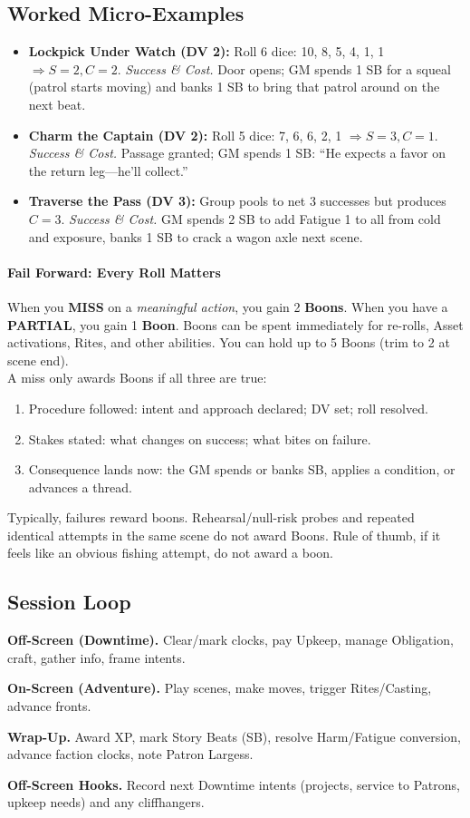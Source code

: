 \subsection{Worked Micro-Examples}
\begin{itemize}
  \item \textbf{Lockpick Under Watch (DV 2):} Roll 6 dice: 10, 8, 5, 4, 1, 1 $\Rightarrow S=2, C=2$. \emph{Success \& Cost.} Door opens; GM spends 1 SB for a squeal (patrol starts moving) and banks 1 SB to bring that patrol around on the next beat.
  \item \textbf{Charm the Captain (DV 2):} Roll 5 dice: 7, 6, 6, 2, 1 $\Rightarrow S=3, C=1$. \emph{Success \& Cost.} Passage granted; GM spends 1 SB: ``He expects a favor on the return leg—he'll collect.''
  \item \textbf{Traverse the Pass (DV 3):} Group pools to net 3 successes but produces $C=3$. \emph{Success \& Cost.} GM spends 2 SB to add Fatigue 1 to all from cold and exposure, banks 1 SB to crack a wagon axle next scene.
\end{itemize}

\paragraph{Fail Forward: Every Roll Matters}
When you \textbf{MISS} on a \emph{meaningful action}, you gain 2 \textbf{Boons}. When you have a \textbf{PARTIAL}, you gain 1 \textbf{Boon}. Boons can be spent immediately for re-rolls, Asset activations, Rites, and other abilities. You can hold up to 5 Boons (trim to 2 at scene end).\\
A miss only awards Boons if all three are true:
\begin{enumerate}
  \item Procedure followed: intent and approach declared; DV set; roll resolved.
  \item Stakes stated: what changes on success; what bites on failure.
  \item Consequence lands now: the GM spends or banks SB, applies a condition, or advances a thread.
\end{enumerate}
Typically, failures reward boons. Rehearsal/null-risk probes and repeated identical attempts in the same scene do not award Boons. Rule of thumb, if it feels like an obvious fishing attempt, do not award a boon.

\subsection{Session Loop}

\textbf{Off-Screen (Downtime).} Clear/mark clocks, pay Upkeep, manage Obligation, craft, gather info, frame intents.

\textbf{On-Screen (Adventure).} Play scenes, make moves, trigger Rites/Casting, advance fronts.

\textbf{Wrap-Up.} Award XP, mark Story Beats (SB), resolve Harm/Fatigue conversion, advance faction clocks, note Patron Largess.

\textbf{Off-Screen Hooks.} Record next Downtime intents (projects, service to Patrons, upkeep needs) and any cliffhangers.

